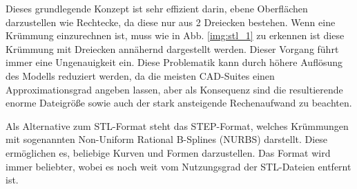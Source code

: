 \documentclass[main.tex]{subfiles}
\begin{document}
Dieses grundlegende Konzept ist sehr effizient darin, ebene Oberflächen darzustellen wie Rechtecke, da diese nur aus 2 Dreiecken bestehen. Wenn eine Krümmung einzurechnen ist, muss wie in Abb. \ref{img:stl_1} zu erkennen ist diese Krümmung mit Dreiecken annähernd dargestellt werden. Dieser Vorgang führt immer eine Ungenauigkeit ein. Diese Problematik kann durch höhere Auflösung des Modells reduziert werden, da die meisten CAD-Suites einen Approximationsgrad angeben lassen, aber als Konsequenz sind die resultierende enorme Dateigröße sowie auch der stark ansteigende Rechenaufwand zu beachten. \parencite{ADOBLESTL} 

Als Alternative zum STL-Format steht das STEP-Format, welches Krümmungen mit sogenannten Non-Uniform Rational B-Splines (NURBS) darstellt.
Diese ermöglichen es, beliebige Kurven und Formen darzustellen. Das Format wird immer beliebter, wobei es noch weit  vom Nutzungsgrad der STL-Dateien entfernt ist. \parencite{ADOBESTEP}
\end{document}
